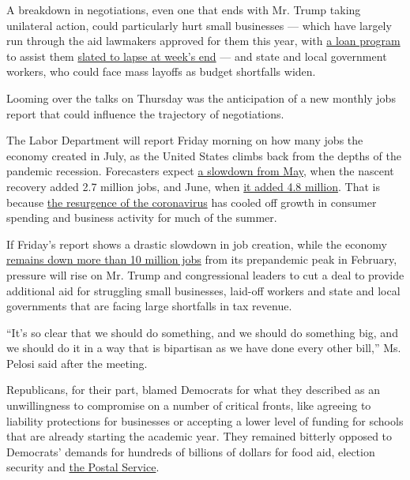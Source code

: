 A breakdown in negotiations, even one that ends with Mr. Trump taking
unilateral action, could particularly hurt small businesses --- which
have largely run through the aid lawmakers approved for them this year,
with
\href{https://www.nytimes.com/2020/07/06/us/ppp-small-business-loans.html}{a
loan program} to assist them
\href{https://www.nytimes.com/2020/08/06/business/small-businesses-relief-program-ending.html}{slated
to lapse at week's end} --- and state and local government workers, who
could face mass layoffs as budget shortfalls widen.

Looming over the talks on Thursday was the anticipation of a new monthly
jobs report that could influence the trajectory of negotiations.

The Labor Department will report Friday morning on how many jobs the
economy created in July, as the United States climbs back from the
depths of the pandemic recession. Forecasters expect
\href{https://www.nytimes.com/2020/06/05/business/economy/jobs-report.html}{a
slowdown from May}, when the nascent recovery added 2.7 million jobs,
and June, when
\href{https://www.nytimes.com/2020/07/02/business/economy/jobs-unemployment-coronavirus.html}{it
added 4.8 million}. That is because
\href{https://www.nytimes.com/interactive/2020/us/coronavirus-us-cases.html}{the
resurgence of the coronavirus} has cooled off growth in consumer
spending and business activity for much of the summer.

If Friday's report shows a drastic slowdown in job creation, while the
economy
\href{https://www.nytimes.com/2020/04/02/business/economy/coronavirus-unemployment-claims.html}{remains
down more than 10 million jobs} from its prepandemic peak in February,
pressure will rise on Mr. Trump and congressional leaders to cut a deal
to provide additional aid for struggling small businesses, laid-off
workers and state and local governments that are facing large shortfalls
in tax revenue.

``It's so clear that we should do something, and we should do something
big, and we should do it in a way that is bipartisan as we have done
every other bill,'' Ms. Pelosi said after the meeting.

Republicans, for their part, blamed Democrats for what they described as
an unwillingness to compromise on a number of critical fronts, like
agreeing to liability protections for businesses or accepting a lower
level of funding for schools that are already starting the academic
year. They remained bitterly opposed to Democrats' demands for hundreds
of billions of dollars for food aid, election security and
\href{https://www.nytimes.com/2020/07/31/us/politics/trump-usps-mail-delays.html}{the
Postal Service}.

